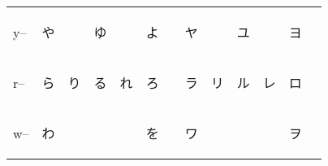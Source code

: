 \begin{table}[H]
\begin{tabular}{l|cccccc|cccccc}
		   y-- & {\begin{CJK}{UTF8}{min} や \end{CJK}} &                                       & {\begin{CJK}{UTF8}{min} ゆ \end{CJK}} &                                      & {\begin{CJK}{UTF8}{min} よ \end{CJK}} &                                       & {\begin{CJK}{UTF8}{min} ヤ \end{CJK}} &                                       & {\begin{CJK}{UTF8}{min} ユ \end{CJK}} &                                       & {\begin{CJK}{UTF8}{min} ヨ \end{CJK}} &                                      \\
           r-- & {\begin{CJK}{UTF8}{min} ら \end{CJK}} & {\begin{CJK}{UTF8}{min} り \end{CJK}} & {\begin{CJK}{UTF8}{min} る \end{CJK}} & {\begin{CJK}{UTF8}{min} れ \end{CJK}} & {\begin{CJK}{UTF8}{min} ろ \end{CJK}} &                                       & {\begin{CJK}{UTF8}{min} ラ \end{CJK}} & {\begin{CJK}{UTF8}{min} リ \end{CJK}} & {\begin{CJK}{UTF8}{min} ル \end{CJK}} & {\begin{CJK}{UTF8}{min} レ \end{CJK}} & {\begin{CJK}{UTF8}{min} ロ \end{CJK}} &                                      \\
		   w-- & {\begin{CJK}{UTF8}{min} わ \end{CJK}} &                                       &                                       &                                      & {\begin{CJK}{UTF8}{min} を \end{CJK}} &                                       & {\begin{CJK}{UTF8}{min} ワ \end{CJK}} &                                       &                                       &                                      & {\begin{CJK}{UTF8}{min} ヲ \end{CJK}} &                                      \\

\end{tabular}
\end{table}
